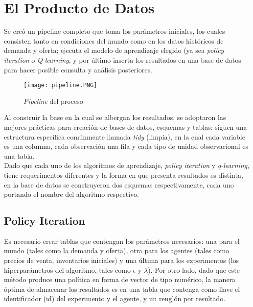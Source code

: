 \chapter{El Producto de Datos}

Se cre\'o un pipeline completo que toma los par\'ametros iniciales, los cuales consisten tanto en condiciones del mundo como en los datos hist\'oricos de demanda y oferta; ejecuta el modelo de aprendizaje elegido (ya sea \textit{policy iteration} o \textit{Q-learning}; y por \'ultimo inserta los resultados en una base de datos para hacer posible consulta y an\'alisis posteriores.\\

\begin{figure}[ht]
\caption{\textit{Pipeline} del proceso}
\label{pipeline}
\texttt{[image: pipeline.PNG]}
\centering
\end{figure}

Al construir la base en la cual se albergan los resultados, se adoptaron las mejores pr\'acticas para creaci\'on de bases de datos, esquemas y tablas: siguen una estructura espec\'ifica com\'unmente llamada \textit{tidy} (limpia), en la cual cada variable es una columna, cada observaci\'on una fila y cada tipo de unidad observacional es una tabla.\\

Dado que cada uno de los algoritmos de aprendizaje, \textit{policy iteration} y \textit{q-learning}, tiene requerimentos diferentes y la forma en que presenta resultados es distinta, en la base de datos se construyeron dos esquemas respectivamente, cada uno portando el nombre del algoritmo respectivo.

\section{Policy Iteration}

Es necesario crear tablas que contengan los par\'ametros necesarios: una para el mundo (tales como la demanda y oferta), otra para los agentes (tales como precios de venta, inventarios iniciales) y una \'ultima para los experimentos (los hiperpar\'ametros del algoritmo, tales como $\epsilon$ y $\lambda$). Por otro lado, dado que este m\'etodo produce una pol\'itica en forma de vector de tipo num\'erico, la manera \'optima de almacenar los resultados es en una tabla que contenga como llave el identificador (id) del experimento y el agente, y un rengl\'on por resultado.\\ 

